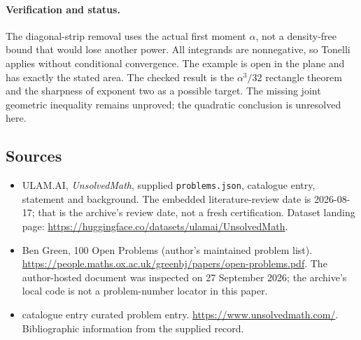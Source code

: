 \documentclass[11pt,a4paper]{article}
\begin{document}
\paragraph{Verification and status.}
The diagonal-strip removal uses the actual first moment $\alpha$, not a density-free bound that would lose another power. All integrands are nonnegative, so Tonelli applies without conditional convergence. The example is open in the plane and has exactly the stated area. The checked result is the $\alpha^3/32$ rectangle theorem and the sharpness of exponent two as a possible target. The missing joint geometric inequality remains unproved; the quadratic conclusion is unresolved here.

\subsection{Sources}

{\small

\begin{itemize}

\item[\hypertarget{source:statement:1}{S1}] ULAM.AI, \emph{UnsolvedMath}, supplied \texttt{problems.json}, catalogue entry, statement and background. The embedded literature-review date is 2026-08-17; that is the archive’s review date, not a fresh certification. Dataset landing page: \url{https://huggingface.co/datasets/ulamai/UnsolvedMath}.

\item[\hypertarget{source:statement:2}{S2}] Ben Green, 100 Open Problems (author’s maintained problem list). \url{https://people.maths.ox.ac.uk/greenbj/papers/open-problems.pdf}. The author-hosted document was inspected on 27 September 2026; the archive’s local code is not a problem-number locator in this paper.

\item[\hypertarget{source:statement:3}{S3}] catalogue entry curated problem entry. \url{https://www.unsolvedmath.com/}. Bibliographic information from the supplied record.

\end{itemize}

}

\label{end:statement}
\end{document}
